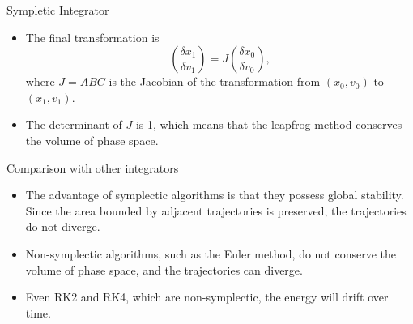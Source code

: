 \documentclass{beamer}
\begin{document}
 \begin{frame}{Sympletic Integrator}
  \begin{itemize}
  \item The final transformation is 
  \[
  \binom{\delta x_1}{\delta v_1}=J\binom{\delta x_0}{\delta v_0},
  \]
  where $J=ABC$ is the Jacobian of the transformation from $(x_0, v_0)$ to $(x_1, v_1)$.
  \item The determinant of $J$ is 1, which means that the leapfrog method conserves the volume of phase space.

  \end{itemize}
 \end{frame}
 \begin{frame}{Comparison with other integrators}
  \begin{itemize}
\item The advantage of symplectic algorithms is that they possess global stability. Since the area
bounded by adjacent trajectories is preserved, the trajectories do not diverge.
\item Non-symplectic algorithms, such as the Euler method, do not conserve the volume of phase space, and the trajectories can diverge.
\item Even RK2 and RK4, which are non-symplectic, the energy will drift over time.
  \end{itemize}
 
 \end{frame}
\end{document}

